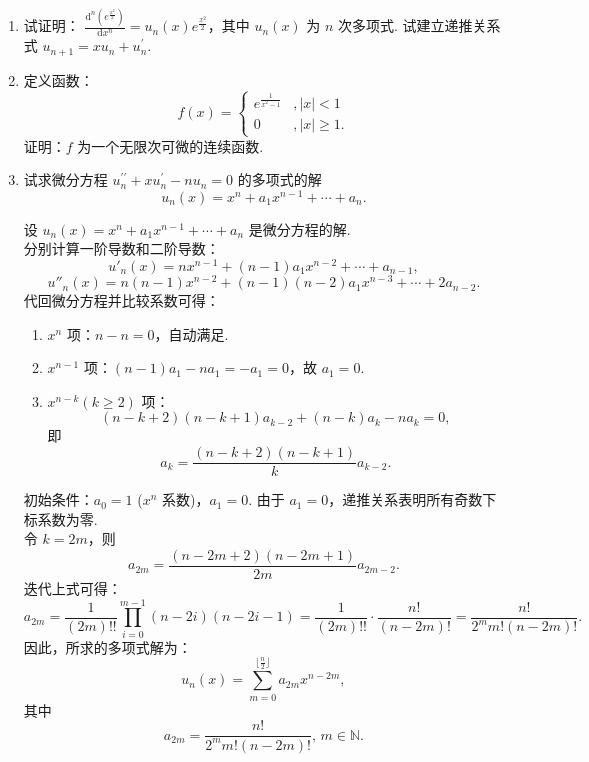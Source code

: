 \begin{enumerate}
    \item[4.]试证明： $\displaystyle \frac{\mathrm{d}^n(e^{\frac{x^2}{2}})}{\mathrm{d}x^n}=u_n(x)e^{\frac{x^2}{2}}$，其中 $u_n(x)$ 为 $n$ 次多项式.
    试建立递推关系式 $u_{n+1}=xu_n+u^{\prime}_n$.
    \item[5.]定义函数：
    \[
        f(x)=
        \begin{cases}
            \displaystyle e^{\frac{1}{x^2-1}}&,\left| x \right|<1\\
            0 &,\left| x \right|\geq1.
        \end{cases}
    \]
    证明：$f$ 为一个无限次可微的连续函数.
    \item[6.]试求微分方程 $u^{\prime\prime}_n+xu^{\prime}_n-nu_n=0$ 的多项式的解
    \[
        \displaystyle u_n(x)=x^n+a_1x^{n-1}+\cdots+a_n.
    \]
    \begin{solution}
        设 $ u_n(x) = x^n + a_1 x^{n-1} + \cdots + a_n $ 是微分方程的解.\\
        分别计算一阶导数和二阶导数：
        \[
        u'_n(x) = n x^{n-1} + (n-1) a_1 x^{n-2} + \cdots + a_{n-1},
        \]
        \[
        u''_n(x) = n(n-1) x^{n-2} + (n-1)(n-2) a_1 x^{n-3} + \cdots + 2a_{n-2}.
        \]
        代回微分方程并比较系数可得：
        \begin{enumerate}
        \item[i.] $x^n$ 项：$n - n = 0$，自动满足.
        \item[ii.] $x^{n-1}$ 项：$(n-1)a_1 - n a_1 = -a_1 = 0$，故 $a_1 = 0$.
        \item[iii.] $x^{n-k}(k\geq 2)$ 项：
        \[
        (n-k+2)(n-k+1) a_{k-2} +(n-k)a_k- n a_k = 0,
        \]
        即
        \[
        a_k = \frac{(n-k+2)(n-k+1)}{k}a_{k-2}.
        \]
        \end{enumerate}
        初始条件：$a_0 = 1$ ($x^n$ 系数)，$a_1 = 0$.
        由于 $a_1 = 0$，递推关系表明所有奇数下标系数为零. \\
        令 $k = 2m$，则
        \[
        a_{2m} = \frac{(n-2m+2)(n-2m+1)}{2m} a_{2m-2}.
        \]
        迭代上式可得：
        \[
        a_{2m} = \frac{1}{(2m)!!} \prod_{i=0}^{m-1} (n-2i)(n-2i-1) = \frac{1}{(2m)!!} \cdot \frac{n!}{(n-2m)!}=\frac{n!}{2^mm!(n-2m)!}.
        \]
        因此，所求的多项式解为：
        \[
        u_n(x) = \sum_{m=0}^{\lfloor \frac{n}{2} \rfloor} a_{2m} x^{n-2m},
        \]
        其中
        \[
        a_{2m} = \frac{n!}{2^mm!(n-2m)!},\,m\in\mathbb{N}.
        \]
    \end{solution}


\end{enumerate}

